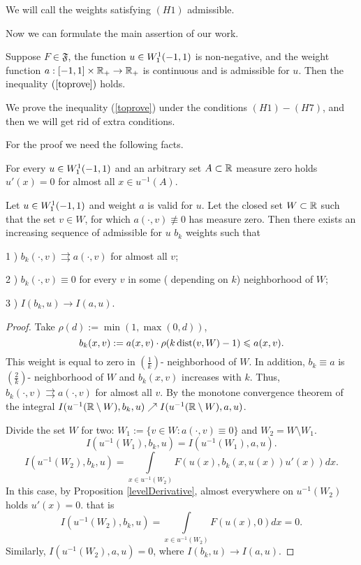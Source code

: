 \bigskip

We will call the weights satisfying $(H1)$ admissible.

Now we can formulate the main assertion of our work.
\begin{thm}
\label{mainThm}
Suppose $F \in \mathfrak{F}$, the function $u \in W_1^1(-1, 1)$ is non-negative,
and the weight function $a: [-1, 1] \times \mathbb R_+ \to \mathbb R_+$ is continuous
and is admissible for $u$.
Then the inequality $(\ref{toprove})$ holds.
\end{thm}

We prove the inequality (\ref{toprove}) under the conditions $(H1)-(H7)$,
and then we will get rid of extra conditions.

For the proof we need the following facts.

\begin{prop}
\label{levelDerivative}
{\rm \cite [ Theorem 6.19]{LL} }
For every $u \in W_1^1(-1, 1)$ and an arbitrary set $A \subset \mathbb R$ measure zero holds
$u'(x) = 0$ for almost all $x \in u^{-1}(A)$.
\end{prop}

\begin{lm}
\label{zeroApprox}
Let $u \in W_1^1(-1, 1)$ and weight $a$ is valid for $u$.
Let the closed set
$W \subset \mathbb R$ such that the set $v \in W$, for which $a(\cdot, v) \not\equiv 0$
has measure zero.
Then there exists an increasing sequence of admissible for $u$ $b_k$ weights such that

1 ) $b_k(\cdot, v) \rightrightarrows a(\cdot, v)$ for almost all $v$;

2 ) $b_k(\cdot, v) \equiv 0$ for every $v$ in some ( depending on $k$) neighborhood of $W$;

3 ) $I(b_k, u) \to I(a, u)$.
\end{lm}

\begin{proof}
Take $\rho(d) := \min(1, \max(0, d))$,
$$b_k(x, v) := a(x, v) \cdot \rho(k \mathop{\rm dist}\nolimits(v, W) - 1) \leqslant a(x, v).$$
This weight is equal to zero in $\left(\frac{1}{k}\right)$- neighborhood of $W$.
In addition, $b_k \equiv a$ is $\left(\frac{2}{k}\right)$- neighborhood of $W$ and
$b_k(x, v)$ increases with $k$.
Thus, $b_k(\cdot, v) \rightrightarrows a(\cdot, v)$ for almost all $v$.
By the monotone convergence theorem of the integral
$I(u^{-1}(\mathbb R \setminus W), b_k, u) \nearrow I(u^{-1}(\mathbb R \setminus W), a, u)$.

Divide the set $W$ for two: $W_1 := \{v \in W: a(\cdot, v) \equiv 0\}$ and $W_2 = W \setminus W_1$.
$$I(u^{-1}(W_1), b_k, u) = I(u^{-1}(W_1), a, u).$$
$$I(u^{-1}(W_2), b_k, u) = \int\limits_{x \in u^{-1}(W_2)} F(u(x), b_k(x, u(x)) u'(x)) dx.$$
In this case, by Proposition \ref{levelDerivative}, almost everywhere on $u^{-1}(W_2)$
holds $u'(x) = 0$.
that is
$$I(u^{-1}(W_2), b_k, u) = \int\limits_{x \in u^{-1}(W_2)} F(u(x), 0) dx = 0.$$
Similarly, $I(u^{-1}(W_2), a, u) = 0$, where $I(b_k, u) \to I(a, u)$.
\end{proof}

